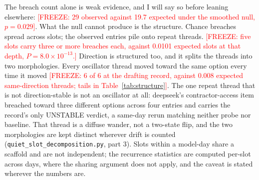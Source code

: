 \documentclass[conference]{IEEEtran}
\newcommand{\freeze}[1]{\textcolor{red}{[FREEZE: #1]}}
\begin{document}
The breach count alone is weak evidence, and I will say so before
leaning elsewhere: \freeze{29 observed against 19.7 expected under
the smoothed null, $p = 0.029$}. What the null cannot produce is
the structure. Chance breaches spread across slots; the observed
entries pile onto repeat threads. \freeze{five slots carry three or
more breaches each, against 0.0101 expected slots at that depth,
$P = 8.0\times10^{-13}$.} Direction is structured too, and it
splits the threads into two morphologies. Every oscillator thread
moved toward the same option every time it moved \freeze{6 of 6 at
the drafting record, against 0.008 expected same-direction threads;
tails in Table~\ref{tab:structure}}. The one repeat thread that is
not direction-stable is not an oscillator at all: deepseek's
contractor-access item breached toward three different options
across four entries and carries the record's only UNSTABLE verdict,
a same-day rerun matching neither probe nor baseline. That thread
is a diffuse wander, not a two-state flip, and the two morphologies
are kept distinct wherever drift is counted
(\texttt{quiet\_slot\_decomposition.py}, part 3). Slots within a
model-day share a scaffold and are not independent; the recurrence
statistics are computed per-slot across days, where the sharing
argument does not apply, and the caveat is stated wherever the
numbers are.
\end{document}

